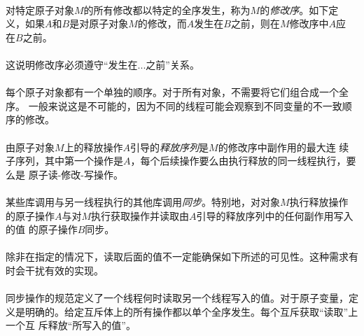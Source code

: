 \paragraph{}
对特定原子对象$M$的所有修改都以特定的全序发生，称为$M$的\textit{修改序}。如下定
义，如果$A$和$B$是对原子对象$M$的修改，而$A$发生在$B$之前，则在$M$修改序中$A$应
在$B$之前。

\paragraph{}
\notes 这说明修改序必须遵守``发生在...之前''关系。

\paragraph{}
\notes 每个原子对象都有一个单独的顺序。对于所有对象，不需要将它们组合成一个全序。
一般来说这是不可能的，因为不同的线程可能会观察到不同变量的不一致顺序的修改。

\paragraph{}
由原子对象$M$上的释放操作$A$引导的\textit{释放序列}是$M$的修改序中副作用的最大连
续子序列，其中第一个操作是$A$，每个后续操作要么由执行释放的同一线程执行，要么是
原子读-修改-写操作。

\paragraph{}
某些库调用与另一线程执行的其他库调用\textit{同步}。特别地，对对象$M$执行释放操作
的原子操作$A$与对$M$执行获取操作并读取由$A$引导的释放序列中的任何副作用写入的值
的原子操作$B$同步。

\paragraph{}
\notes 除非在指定的情况下，读取后面的值不一定能确保如下所述的可见性。这种需求有
时会干扰有效的实现。

\paragraph{}
\notes 同步操作的规范定义了一个线程何时读取另一个线程写入的值。对于原子变量，定
义是明确的。给定互斥体上的所有操作都以单个全序发生。每个互斥获取``读取''上一个互
斥释放``所写入的值''。

